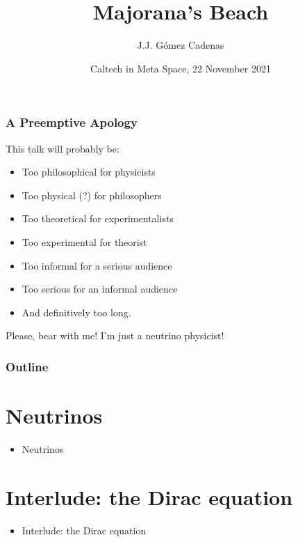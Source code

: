 \documentclass[9pt]{beamer}
\title{Majorana's Beach}
\author{J.J. G\'omez Cadenas}
\institute{Donostia International Physics Center (DIPC)} %
\date[November 22, 2021] %
{Caltech in Meta Space, 22 November 2021}
\begin{document}
\frame{\titlepage}

\begin{frame}
\frametitle{A Preemptive Apology}
This talk will probably be:

\begin{itemize}
\item Too philosophical for physicists
\item Too physical (?) for philosophers
\item Too theoretical for experimentalists
\item Too experimental for theorist
\item Too informal for a serious audience
\item Too serious for an informal audience 
\item And definitively too long.
\end{itemize}
\alert{Please, bear with me! I'm just a neutrino physicist!}

\end{frame}

\begin{frame}
\frametitle{Outline}
\tableofcontents
\end{frame}

\section{Neutrinos}
\begin{frame}
\begin{itemize}
\item Neutrinos
\end{itemize}
\end{frame}

%
%


\section{Interlude: the Dirac equation}

\begin{frame}
\begin{itemize}
\item Interlude: the Dirac equation
\end{itemize}
\end{frame}





%
\end{document}
